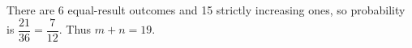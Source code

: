 There are 6 equal-result outcomes and 15 strictly increasing ones, so probability is $\dfrac{21}{36}=\dfrac{7}{12}$. Thus $\boxed{m+n=19}$.

